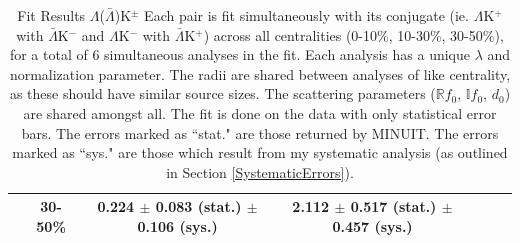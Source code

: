 \documentclass[../AnalysisNoteJBuxton.tex]{subfiles}
\begin{document}
\begin{landscape}
\begin{table}[htbp]
{\begin{tabular}{|c|c|c|c|c|c|c|}
   & 30-50\% & 0.224 $\pm$ 0.083 (stat.) $\pm$ 0.106 (sys.)  %
             & 2.112 $\pm$ 0.517 (stat.) $\pm$ 0.457 (sys.)  %
             & & & \\
  \hline
 \end{tabular}}
 \caption{Fit Results $\Lambda$($\bar{\Lambda}$)K$^{\pm}$
 Each pair is fit simultaneously with its conjugate (ie. $\Lambda$K$^{+}$ with $\bar{\Lambda}$K$^{-}$ and $\Lambda$K$^{-}$ with $\bar{\Lambda}$K$^{+}$) across all centralities (0-10\%, 10-30\%, 30-50\%), for a total of 6 simultaneous analyses in the fit.
 Each analysis has a unique $\lambda$ and normalization parameter.
 The radii are shared between analyses of like centrality, as these should have similar source sizes.
 The scattering parameters ($\mathbb{R}f_{0}$, $\mathbb{I}f_{0}$, $d_{0}$) are shared amongst all.
 The fit is done on the data with only statistical error bars.
 The errors marked as ``stat." are those returned by MINUIT.
 The errors marked as ``sys." are those which result from my systematic analysis (as outlined in Section \ref{SystematicErrors}).}
 \label{tab:FitResultsLamKch}
\end{table}

\end{landscape}
\end{document}

